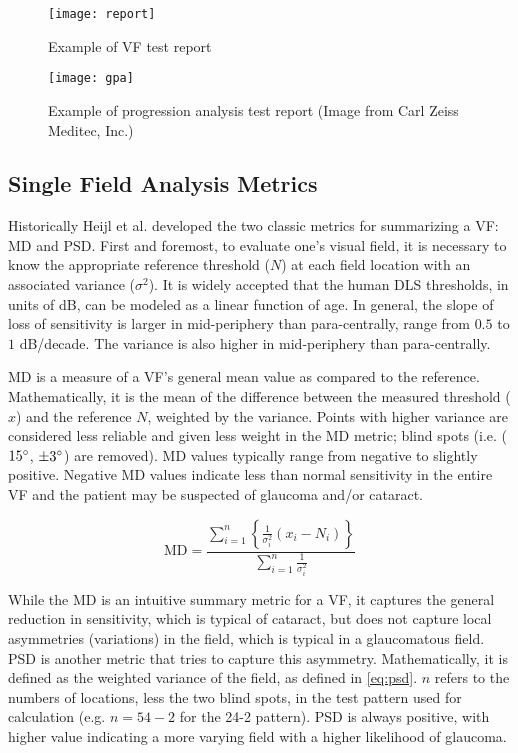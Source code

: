 \begin{figure}[p]
	\texttt{[image: report]}
	\caption{Example of  \acl{VF} test report}
	\label{fig:report}
\end{figure}

\begin{figure}[p]
	\texttt{[image: gpa]}
	\caption[ progression analysis test report]{Example of  progression analysis test report (Image from Carl Zeiss Meditec, Inc.)}
	\label{fig:gpa}
\end{figure}

\subsection{Single Field Analysis Metrics}

Historically Heijl et al. developed the two classic metrics for summarizing a \acl{VF}: \ac{MD} and \ac{PSD}. \cite{Heijl1987} First and foremost, to evaluate one's visual field, it is necessary to know the appropriate reference threshold ($N$) at each field location with an associated variance ($\sigma^2$). It is widely accepted that the human \ac{DLS} thresholds, in units of dB, can be modeled as a linear function of age. \cite{Heijl1987a} In general, the slope of loss of sensitivity is larger in mid-periphery than para-centrally, range from $0.5$ to $1$ dB/decade. The variance is also higher in mid-periphery than para-centrally. 

\ac{MD} is a measure of a \acl{VF}'s general mean value as compared to the reference. Mathematically, it is the mean of the difference between the measured threshold ($x$) and the reference $N$, weighted by the variance. Points with higher variance are considered less reliable and given less weight in the \ac{MD} metric; blind spots (i.e. ($15\degree$, $\pm3\degree$) are removed). MD values typically range from negative to slightly positive. Negative MD values indicate less than normal sensitivity in the entire \acl{VF} and the patient may be suspected of glaucoma and/or cataract.

\begin{equation} \label{eq:md}
\textrm{MD} =\frac{ 
\sum\limits_{i=1}^{n} \left\{
\frac{1}{\sigma_{i}^2} (x_i-N_i)
\right\} }{
\sum\limits_{i=1}^{n} 
\frac{1}{\sigma_{i}^2} 
}
\end{equation}

While the \ac{MD} is an intuitive summary metric for a \acl{VF}, it captures the general reduction in sensitivity, which is typical of cataract, but does not capture local asymmetries (variations) in the field, which is typical in a glaucomatous field. \ac{PSD} is another metric that tries to capture this asymmetry. Mathematically, it is defined as the weighted variance of the field, as defined in \cref{eq:psd}. $n$ refers to the numbers of locations, less the two blind spots, in the test pattern used for calculation (e.g. $n=54-2$ for the 24-2 pattern). \ac{PSD} is always positive, with higher value indicating a more varying field with a higher likelihood of glaucoma.

